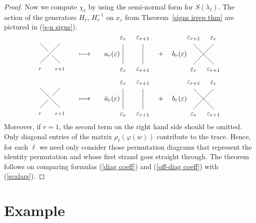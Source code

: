 \documentclass [12pt, letterpaper, oneside] {amsart}
\newcommand \e {\varepsilon}
\renewcommand \l {\lambda}
\theoremstyle {plain}
\begin{document}
\begin {proof}
Now we compute $\chi_\ell$ by using the semi-normal form for
$S(\l_\ell)$.
The action of the generators $H_r$, $H_r^{-1}$ on $x_{\e}$ from Theorem~\ref {signs irrep thm} are pictured in (\ref{s-n signs}).
\begin {equation} \label {s-n signs}
\begin {array} {c c c}
\vcenter{
\xy
(0,0);(10,10)**@{-},
(10,0);(6,4)**@{-},
(4,6);(0,10)**@{-},
(0,-3)*{_r},
(10,-3)*{_{r+1}},
(0,13)*{}
\endxy
} \quad &\longmapsto& \quad a_r(\e) \vcenter{
\xy
(0,0);(0,10)**@{-},
(10,0);(10,10)**@{-},
(0,-3)*{\e_r},
(0,13)*{\e_r},
(10,-3)*{\e_{r+1}},
(10,13)*{\e_{r+1}}
\endxy
} \quad + \quad b_r(\e) \vcenter{
\xy
(0,0);(10,10)**@{-},
(10,0);(0,10)**@{-},
(0,-3)*{\e_r},
(10,13)*{\e_r},
(10,-3)*{\e_{r+1}},
(0,13)*{\e_{r+1}}
\endxy
} \\
&& \\
\vcenter{
\xy
(0,0);(4,4)**@{-},
(6,6);(10,10)**@{-},
(10,0);(0,10)**@{-},
(0,-3)*{_r},
(10,-3)*{_{r+1}},
(0,13)*{}
\endxy
} \quad &\longmapsto& \quad \bar a_r(\e) \vcenter{
\xy
(0,0);(0,10)**@{-},
(10,0);(10,10)**@{-},
(0,-3)*{\e_r},
(0,13)*{\e_r},
(10,-3)*{\e_{r+1}},
(10,13)*{\e_{r+1}}
\endxy
} \quad + \quad b_r(\e) \vcenter{
\xy
(0,0);(10,10)**@{-},
(10,0);(0,10)**@{-},
(0,-3)*{\e_r},
(10,13)*{\e_r},
(10,-3)*{\e_{r+1}},
(0,13)*{\e_{r+1}}
\endxy
}
\end {array}
\end {equation}
Moreover, if $r = 1$, the second term on the right hand side should be omitted.
Only diagonal entries of the matrix $\rho_\ell(\varphi(w))$ contribute to the trace.  Hence, for each $\ell$ we need only consider those permutation diagrams that represent the identity permutation and whose first strand goes straight through.  The theorem follows on comparing formulas (\ref {diag coeff}) and (\ref {off-diag coeff}) with (\ref {scalars}).
\end {proof}

\section {Example} \label {sec ex}
\end{document}
